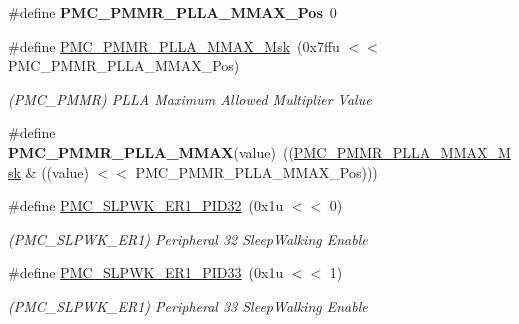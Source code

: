 \begin{DoxyCompactItemize}
\mbox{\label{group__SAME70__PMC_ga4b43c410ef9a91d3a80ddfb37620a98d}} 
\#define {\bfseries P\+M\+C\+\_\+\+P\+M\+M\+R\+\_\+\+P\+L\+L\+A\+\_\+\+M\+M\+A\+X\+\_\+\+Pos}~0
\item 
\mbox{\label{group__SAME70__PMC_ga953c032e7a1789cfd1c988f1b8714fe3}} 
\#define \mbox{\hyperlink{group__SAME70__PMC_ga953c032e7a1789cfd1c988f1b8714fe3}{P\+M\+C\+\_\+\+P\+M\+M\+R\+\_\+\+P\+L\+L\+A\+\_\+\+M\+M\+A\+X\+\_\+\+Msk}}~(0x7ffu $<$$<$ P\+M\+C\+\_\+\+P\+M\+M\+R\+\_\+\+P\+L\+L\+A\+\_\+\+M\+M\+A\+X\+\_\+\+Pos)
\begin{DoxyCompactList}\small\item\em (P\+M\+C\+\_\+\+P\+M\+MR) P\+L\+LA Maximum Allowed Multiplier Value \end{DoxyCompactList}\item 
\mbox{\label{group__SAME70__PMC_ga13800fa5e46659c40a881c5e77a30fb7}} 
\#define {\bfseries P\+M\+C\+\_\+\+P\+M\+M\+R\+\_\+\+P\+L\+L\+A\+\_\+\+M\+M\+AX}(value)~((\mbox{\hyperlink{group__SAMV71__PMC_ga953c032e7a1789cfd1c988f1b8714fe3}{P\+M\+C\+\_\+\+P\+M\+M\+R\+\_\+\+P\+L\+L\+A\+\_\+\+M\+M\+A\+X\+\_\+\+Msk}} \& ((value) $<$$<$ P\+M\+C\+\_\+\+P\+M\+M\+R\+\_\+\+P\+L\+L\+A\+\_\+\+M\+M\+A\+X\+\_\+\+Pos)))
\item 
\mbox{\label{group__SAME70__PMC_ga3f5ae5306da2d67e62c5d04420d98b28}} 
\#define \mbox{\hyperlink{group__SAME70__PMC_ga3f5ae5306da2d67e62c5d04420d98b28}{P\+M\+C\+\_\+\+S\+L\+P\+W\+K\+\_\+\+E\+R1\+\_\+\+P\+I\+D32}}~(0x1u $<$$<$ 0)
\begin{DoxyCompactList}\small\item\em (P\+M\+C\+\_\+\+S\+L\+P\+W\+K\+\_\+\+E\+R1) Peripheral 32 Sleep\+Walking Enable \end{DoxyCompactList}\item 
\mbox{\label{group__SAME70__PMC_gaddc5483c142f6d61017e04bd4200127a}} 
\#define \mbox{\hyperlink{group__SAME70__PMC_gaddc5483c142f6d61017e04bd4200127a}{P\+M\+C\+\_\+\+S\+L\+P\+W\+K\+\_\+\+E\+R1\+\_\+\+P\+I\+D33}}~(0x1u $<$$<$ 1)
\begin{DoxyCompactList}\small\item\em (P\+M\+C\+\_\+\+S\+L\+P\+W\+K\+\_\+\+E\+R1) Peripheral 33 Sleep\+Walking Enable \end{DoxyCompactList}\item 

\end{DoxyCompactItemize}
